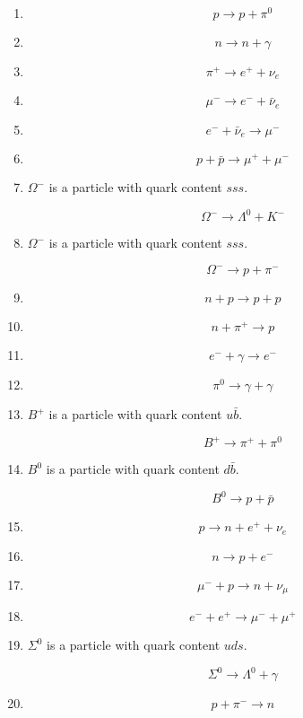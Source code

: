 \documentclass[12pt]{article}
\newcommand{\workspace}{
\vspace{1.2cm}
}
\begin{document}
\begin{enumerate}
\[
D^0 \rightarrow K^- + \pi^+
\]
\workspace

\item
\[
p \rightarrow p + \pi^0
\]
\workspace

\item
\[
n \rightarrow n + \gamma
\]
\workspace

\item
\[
\pi^+ \rightarrow e^+ + \nu_e
\]
\workspace

\item
\[
\mu^- \rightarrow e^- + \bar{\nu}_e
\]
\workspace

\item
\[
e^- + \bar{\nu}_e \rightarrow \mu^-
\]
\workspace

\item
\[
p + \bar{p} \rightarrow \mu^+ + \mu^-
\]
\workspace

\item
$\Omega^-$ is a particle with quark content $sss$.

\[
\Omega^- \rightarrow \Lambda^0 + K^-
\]
\workspace

\item
$\Omega^-$ is a particle with quark content $sss$.

\[
\Omega^- \rightarrow p + \pi^- 
\]
\workspace

\item
\[
n + p \rightarrow p + p
\]
\workspace

\item
\[
n + \pi^+ \rightarrow p
\]
\workspace

\item
\[
e^- + \gamma \rightarrow e^- 
\]
\workspace

\item
\[
\pi^0 \rightarrow \gamma + \gamma
\]
\workspace

\item
$B^+$ is a particle with quark content $u\bar{b}$.

\[
B^+ \rightarrow \pi^+ + \pi^0
\]
\workspace

\item
$B^0$ is a particle with quark content $d\bar{b}$.

\[
B^0 \rightarrow p + \bar{p}
\]
\workspace

\item
\[
p \rightarrow n + e^+ + \nu_e
\]
\workspace

\item
\[
n \rightarrow p + e^-
\]
\workspace

\item
\[
\mu^- + p \rightarrow n + \nu_\mu
\]
\workspace

\item
\[
e^- + e^+ \rightarrow \mu^- + \mu^+
\]
\workspace

\item
$\Sigma^0$ is a particle with quark content $uds$.

\[
\Sigma^0 \rightarrow \Lambda^0 + \gamma
\]
\workspace

\item
\[
p + \pi^- \rightarrow n
\]
\workspace

\end{enumerate}
\end{document}
